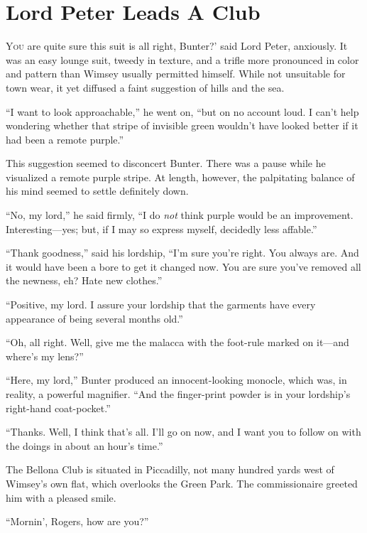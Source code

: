 \chapter{Lord Peter Leads A Club}
\lettrine[lines=4,ante=‘]{Y}{ou} are quite sure this suit is all right, Bunter?' said Lord Peter, anxiously. It was an easy lounge suit, tweedy in texture, and a trifle more pronounced in color and pattern than Wimsey usually permitted himself. While not unsuitable for town wear, it yet diffused a faint suggestion of hills and the sea.

\enquote{I want to look approachable,} he went on, \enquote{but on no account loud. I can't help wondering whether that stripe of invisible green wouldn't have looked better if it had been a remote purple.}

This suggestion seemed to disconcert Bunter. There was a pause while he visualized a remote purple stripe. At length, however, the palpitating balance of his mind seemed to settle definitely down.

\enquote{No, my lord,} he said firmly, \enquote{I do \textit{not} think purple would be an improvement. Interesting\allowbreak---\allowbreak yes; but, if I may so express myself, decidedly less affable.}

\enquote{Thank goodness,} said his lordship, \enquote{I'm sure you're right. You always are. And it would have been a bore to get it changed now. You are sure you've removed all the newness, eh? Hate new clothes.}

\enquote{Positive, my lord. I assure your lordship that the garments have every appearance of being several months old.}

\enquote{Oh, all right. Well, give me the malacca with the foot-rule marked on it\allowbreak---\allowbreak and where's my lens?}

\enquote{Here, my lord,} Bunter produced an innocent-looking monocle, which was, in reality, a powerful magnifier. \enquote{And the finger-print powder is in your lordship's right-hand coat-pocket.}

\enquote{Thanks. Well, I think that's all. I'll go on now, and I want you to follow on with the doings in about an hour's time.}

The Bellona Club is situated in Piccadilly, not many hundred yards west of Wimsey's own flat, which overlooks the Green Park. The commissionaire greeted him with a pleased smile.

\enquote{Mornin', Rogers, how are you?}

